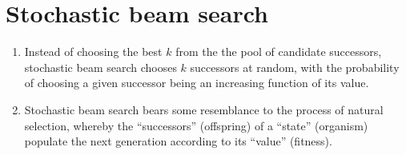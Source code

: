 \section{Stochastic beam search \cite{ai/book/Artificial-Intelligence-A-Modern-Approach/Russell-Norvig}}
\label{AI: Algorithms/stochastic beam search}


\begin{enumerate}
    \item Instead of choosing the best $k$ from the the pool of candidate successors, stochastic beam search chooses $k$ successors at random, with the probability of choosing a given successor being an increasing function of its value. 
    \hfill \cite{ai/book/Artificial-Intelligence-A-Modern-Approach/Russell-Norvig}
    
    \item Stochastic beam search bears some resemblance to the process of natural selection, whereby the “successors” (offspring) of a “state” (organism) populate the next generation according to its “value” (fitness).
    \hfill \cite{ai/book/Artificial-Intelligence-A-Modern-Approach/Russell-Norvig}
\end{enumerate}























